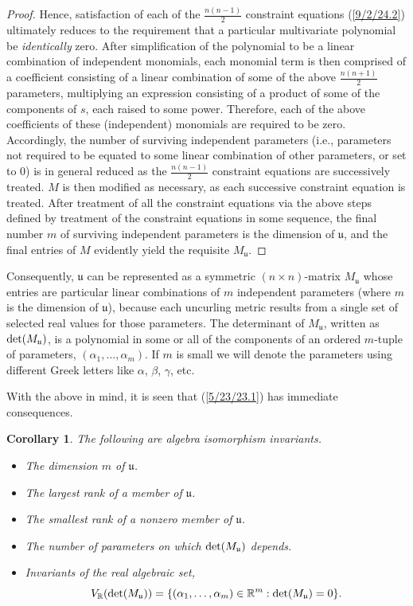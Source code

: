 \documentclass{amsart}
\numberwithin{equation}{section}
\newtheorem{corollary}[theorem]{Corollary}
\theoremstyle{definition}
\numberwithin{theorem}{section}
\begin{document}
\begin{proof}
Hence, satisfaction of each of the $\frac{n(n-1)}{2}$ constraint equations (\ref{9/2/24.2}) ultimately reduces to the requirement that a particular multivariate polynomial be {\it identically} zero.  After simplification of the polynomial to be a linear combination of independent monomials, each monomial term is then comprised of a coefficient consisting of a linear combination of some of the above $\frac{n(n+1)}{2}$ parameters, multiplying an expression consisting of a product of some of the components of $s$, each raised to some power.  Therefore, each of the above coefficients of these (independent) monomials are required to be zero.  Accordingly, the number of surviving independent parameters (i.e., parameters not required to be equated to some linear combination of other parameters, or set to 0) is in general reduced as the $\frac{n(n-1)}{2}$ constraint equations are successively treated.  $M$ is then modified as necessary, as each successive constraint equation is treated.  After treatment of all the constraint equations via the above steps defined by treatment of the constraint equations in some sequence, the final number $m$ of surviving independent parameters is the dimension of $\mathfrak{u}$, and the final entries of $M$ evidently yield the requisite $M_\mathfrak{u}$.
\end{proof}

Consequently, $\mathfrak{u}$ can be represented as a symmetric $(n\times n)$-matrix $M_{\mathfrak{u}}$ whose entries are particular linear combinations of $m$ independent parameters (where $m$ is the dimension of $\mathfrak{u}$), because each uncurling metric results from a single set of selected real values for those parameters.  The determinant of $M_{\mathfrak{u}}$, written as ${\rm det}(M_{\mathfrak{u}})$, is a polynomial in some or all of the components of an ordered $m$-tuple of parameters, $(\alpha_1,\dots,\alpha_m)$.  If $m$ is small  we will denote the parameters using different Greek letters like $\alpha$, $\beta$, $\gamma$, etc. 

\bigskip

   With the above in mind, it is seen that (\ref{5/23/23.1}) has immediate consequences. 
   
              
  \begin{corollary}\label{8/18/23.2} The following are algebra isomorphism invariants. \begin{itemize} \item The dimension $m$ of $\mathfrak{u}$.   \item The largest rank  of a member of $\mathfrak{u}$.  \item The smallest rank of a nonzero member of $\mathfrak{u}$. \item The number of parameters on which ${\rm det}(M_{\mathfrak{u}})$ depends. \item Invariants of the real algebraic set, \[V_\mathbb{R}({\rm det}(M_{\mathfrak{u}})) = \{(\alpha_1,\dots,\alpha_m)\in\mathbb{R}^m: {\rm det}(M_{\mathfrak{u}}) = 0 \}.\] \end{itemize} \end{corollary}
  
\end{document}
